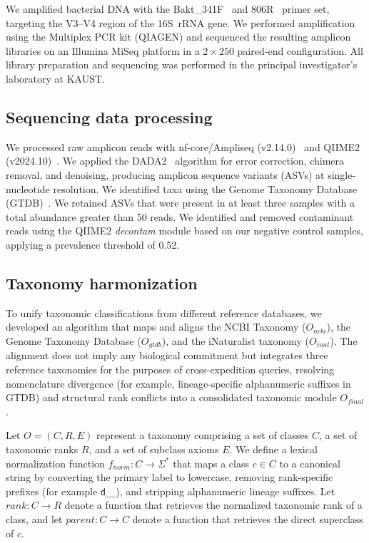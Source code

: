 \documentclass[11pt,a4paper]{article}
\begin{document}
We amplified bacterial DNA with the Bakt\_341F~\cite{Fprimer} and
806R~\cite{Rprimer} primer set, targeting the V3--V4 region of the
16S~rRNA gene. We performed amplification using the Multiplex PCR kit
(QIAGEN) and sequenced the resulting amplicon libraries on an Illumina
MiSeq platform in a $2\times 250$ paired-end configuration. All
library preparation and sequencing was performed in the principal
investigator's laboratory at KAUST.

\subsection{Sequencing data processing}

We processed raw amplicon reads with nf-core/Ampliseq
(v2.14.0)~\cite{nfcore,ampliseq} and QIIME2
(v2024.10)~\cite{qiime2}. We applied the DADA2~\cite{dada2} algorithm
for error correction, chimera removal, and denoising, producing
amplicon sequence variants (ASVs) at single-nucleotide
resolution. We identified taxa using the Genome Taxonomy Database
(GTDB)~\cite{gtdb}. We retained ASVs that were present in at least
three samples with a total abundance greater than 50 reads. We
identified and removed contaminant reads using the QIIME2
\textit{decontam} module based on our negative control samples,
applying a prevalence threshold of 0.52.

\subsection{Taxonomy harmonization}

To unify taxonomic classifications from different reference databases,
we developed an algorithm that maps and aligns the NCBI Taxonomy
($O_{ncbi}$), the Genome Taxonomy Database ($O_{gtdb}$), and the
iNaturalist taxonomy ($O_{inat}$). The alignment does not imply any
biological commitment but integrates three reference taxonomies for
the purposes of cross-expedition queries, resolving nomenclature
divergence (for example, lineage-specific alphanumeric suffixes in
GTDB) and structural rank conflicts into a consolidated taxonomic
module $O_{final}$.

Let $O = (C, R, E)$ represent a taxonomy comprising a set of classes
$C$, a set of taxonomic ranks $R$, and a set of subclass axioms
$E$. We define a lexical normalization function
$f_{norm}: C \to \Sigma^*$ that maps a class $c \in C$ to a canonical
string by converting the primary label to lowercase, removing
rank-specific prefixes (for example \texttt{d\_\_}), and stripping
alphanumeric lineage suffixes. Let $\mathit{rank}: C \to R$ denote a
function that retrieves the normalized taxonomic rank of a class, and
let $\mathit{parent}: C \to C$ denote a function that retrieves the
direct superclass of $c$.
\end{document}
